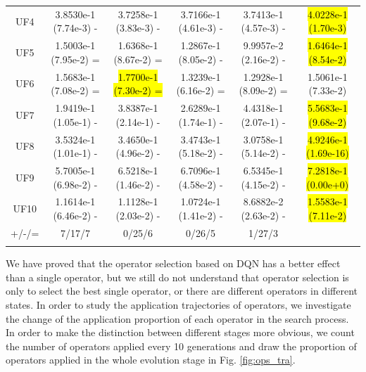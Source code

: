 \documentclass[journal]{IEEEtran}
\begin{document}
\begin{table}[tbp]
\begin{tabular}{cccccc}
        UF4     & 3.8530e-1 (7.74e-3) -      & 3.7258e-1 (3.83e-3) -      & 3.7166e-1 (4.61e-3) - & 3.7413e-1 (4.57e-3) -      & \hl{4.0228e-1 (1.70e-3)}  \\
        UF5     & 1.5003e-1 (7.95e-2) =      & 1.6368e-1 (8.67e-2) =      & 1.2867e-1 (8.05e-2) - & 9.9957e-2 (2.16e-2) -      & \hl{1.6464e-1 (8.54e-2)}  \\
        UF6     & 1.5683e-1 (7.08e-2) =      & \hl{1.7700e-1 (7.30e-2) =} & 1.3239e-1 (6.16e-2) = & 1.2928e-1 (8.09e-2) =      & 1.5061e-1 (7.33e-2)       \\
        UF7     & 1.9419e-1 (1.05e-1) -      & 3.8387e-1 (2.14e-1) -      & 2.6289e-1 (1.74e-1) - & 4.4318e-1 (2.07e-1) -      & \hl{5.5683e-1 (9.68e-2)}  \\
        UF8     & 3.5324e-1 (1.01e-1) -      & 3.4650e-1 (4.96e-2) -      & 3.4743e-1 (5.18e-2) - & 3.0758e-1 (5.14e-2) -      & \hl{4.9246e-1 (1.69e-16)} \\
        UF9     & 5.7005e-1 (6.98e-2) -      & 6.5218e-1 (1.46e-2) -      & 6.7096e-1 (4.58e-2) - & 6.5345e-1 (4.15e-2) -      & \hl{7.2818e-1 (0.00e+0)}  \\
        UF10    & 1.1614e-1 (6.46e-2) -      & 1.1128e-1 (2.03e-2) -      & 1.0724e-1 (1.41e-2) - & 8.6882e-2 (2.63e-2) -      & \hl{1.5583e-1 (7.11e-2)}  \\
        \hline
        +/-/=   & 7/17/7                     & 0/25/6                     & 0/26/5                & 1/27/3                     &                           \\
        \label{tab:hv_ops}
    \end{tabular}
\end{table}

We have proved that the operator selection based on DQN has a better effect than a single operator, but we still do not understand that operator selection is only to select the best single operator, or there are different operators in different states. In order to study the application trajectories of operators, we investigate the change of the application proportion of each operator in the search process.
In order to make the distinction between different stages more obvious, we count the number of operators applied every 10 generations and draw the proportion of operators applied in the whole evolution stage in Fig. \ref{fig:ops_tra}.
\end{document}
